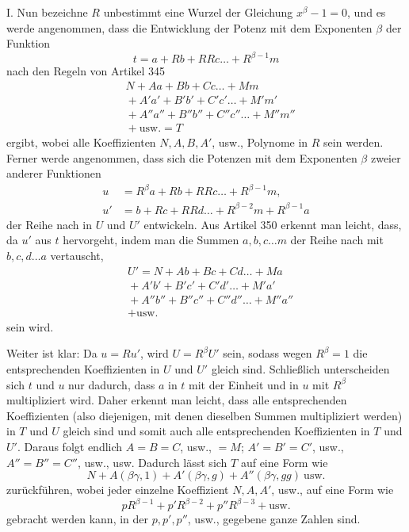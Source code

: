I. Nun bezeichne \(R\) unbestimmt eine Wurzel der Gleichung \(x^\beta-1=0\), und es werde angenommen, dass die Entwicklung der Potenz mit dem Exponenten \(\beta\) der Funktion \[t=a+Rb+RRc\ldots+R^{\beta-1}m\] nach den Regeln von Artikel 345 \[\begin{aligned}&N+Aa+Bb+Cc\ldots+Mm\\&{}+A'a'+B'b'+C'c'\ldots+M'm'\\&{}+A''a''+B''b''+C''c''\ldots+M''m''\\&{}+\text{usw.}=T\end{aligned}\] ergibt, wobei alle Koeffizienten \(N,\allowbreak A,\allowbreak B,\allowbreak A'\), usw., Polynome in \(R\) sein werden. Ferner werde angenommen, dass sich die Potenzen mit dem Exponenten \(\beta\) zweier anderer Funktionen \[\begin{aligned}u&=R^\beta a+Rb+RRc\ldots+R^{\beta-1}m,\\u'&=b+Rc+RRd\ldots+R^{\beta-2}m+R^{\beta-1}a\end{aligned}\] der Reihe nach in \(U\) und \(U'\) entwickeln. Aus Artikel 350 erkennt man leicht, dass, da \(u'\) aus \(t\) hervorgeht, indem man die Summen \(a,\allowbreak b,\allowbreak c\ldots m\) der Reihe nach mit \(b,\allowbreak c,\allowbreak d\ldots a\) vertauscht, \[\begin{aligned}&U'=N+Ab+Bc+Cd\ldots+Ma\\&{}+A'b'+B'c'+C'd'\ldots+M'a'\\&{}+A''b''+B''c''+C''d''\ldots+M''a''\\&{}+\text{usw.}\end{aligned}\] sein wird.

Weiter ist klar: Da \(u=Ru'\), wird \(U=R^\beta U'\) sein, sodass wegen \(R^\beta=1\) die entsprechenden Koeffizienten in \(U\) und \(U'\) gleich sind. Schließlich unterscheiden sich \(t\) und \(u\) nur dadurch, dass \(a\) in \(t\) mit der Einheit und in \(u\) mit \(R^\beta\) multipliziert wird. Daher erkennt man leicht, dass alle entsprechenden Koeffizienten (also diejenigen, mit denen dieselben Summen multipliziert werden) in \(T\) und \(U\) gleich sind und somit auch alle entsprechenden Koeffizienten in \(T\) und \(U'\). Daraus folgt endlich \(A=B=C\), usw., \(=M\);
\(A'=B'=C'\), usw., \(A''=B''=C''\), usw., usw. Dadurch lässt sich \(T\) auf eine Form wie \[N+A(\beta\gamma,1)+A'(\beta\gamma,g)+A''(\beta\gamma,gg)\ \text{usw.}\] zurückführen, wobei jeder einzelne Koeffizient \(N,\allowbreak A,\allowbreak A'\), usw., auf eine Form wie \[pR^{\beta-1}+p'R^{\beta-2}+p''R^{\beta-3}+\text{usw.}\] gebracht werden kann, in der \(p,\allowbreak p',\allowbreak p''\), usw., gegebene ganze Zahlen sind.

